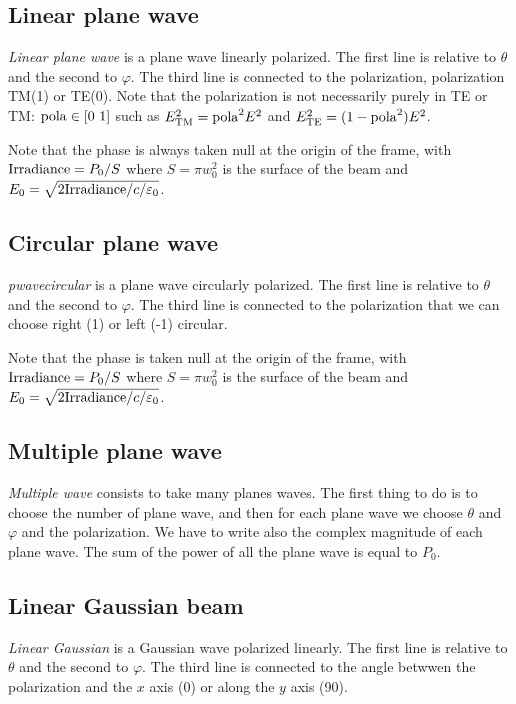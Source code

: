 \subsection{Linear plane wave }

{\it Linear plane wave} is a plane wave linearly polarized. The first
line is relative to $\theta$ and the second to $\varphi$. The third
line is connected to the polarization, polarization TM(1) or TE(0).
Note that the polarization is not necessarily purely in TE or TM:
${\rm pola}\in[0~1]$ such as $E^2_{\rm TM}={\rm pola}^2E^2$ and
$E^2_{\rm TE}=(1-{\rm pola}^2)E^2$.

Note that the phase is always taken null at the origin of the frame,
with ${\rm Irradiance}=P_0/S$ where $S=\pi w_0^2$ is the surface of
the beam and $E_0=\sqrt{2 {\rm Irradiance}/c/\varepsilon_0}$.


\subsection{Circular plane wave }

{\it pwavecircular } is a plane wave circularly polarized. The first
line is relative to $\theta$ and the second to $\varphi$. The third
line is connected to the polarization that we can choose right (1) or
left (-1) circular.

Note that the phase is taken null at the origin of the frame, with
${\rm Irradiance}=P_0/S$ where $S=\pi w_0^2$ is the surface of the
beam and $E_0=\sqrt{2 {\rm Irradiance}/c/\varepsilon_0}$.


\subsection{Multiple plane wave}

{\it Multiple wave} consists to take many planes waves. The first
thing to do is to choose the number of plane wave, and then for each
plane wave we choose $\theta$ and $\varphi$ and the polarization. We
have to write also the complex magnitude of each plane wave. The sum
of the power of all the plane wave is equal to $P_0$.


\subsection{Linear Gaussian beam}


{\it Linear Gaussian} is a Gaussian wave polarized linearly. The first
line is relative to $\theta$ and the second to $\varphi$. The third
line is connected to the angle betwwen the polarization and the $x$
axis (0) or along the $y$ axis (90).

